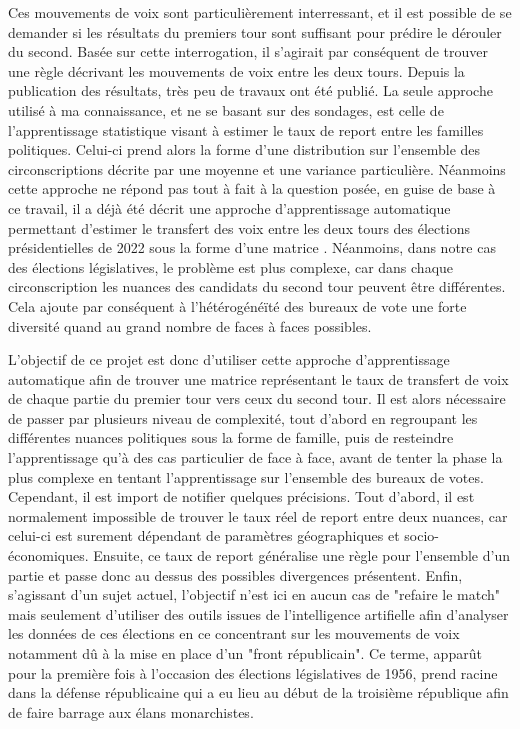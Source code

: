 \documentclass[11pt]{article}
\begin{document}
    Ces mouvements de voix sont particulièrement interressant, et il est possible de se demander si les résultats du premiers tour sont suffisant pour prédire le dérouler du second. Basée sur cette interrogation, il s'agirait par conséquent de trouver une règle décrivant les mouvements de voix entre les deux tours. Depuis la publication des résultats, très peu de travaux ont été publié. La seule approche utilisé à ma connaissance, et ne se basant sur des sondages, est celle de l'apprentissage statistique \cite{Amblard_2024} visant à estimer le taux de report entre les familles politiques. Celui-ci prend alors la forme d'une distribution sur l'ensemble des circonscriptions décrite par une moyenne et une variance particulière. Néanmoins cette approche ne répond pas tout à fait à la question posée, en guise de base à ce travail, il a déjà été décrit une approche d'apprentissage automatique permettant d'estimer le transfert des voix entre les deux tours des élections présidentielles de 2022 sous la forme d'une matrice \cite{Perrinet_2022}. Néanmoins, dans notre cas des élections législatives, le problème est plus complexe, car dans chaque circonscription les nuances des candidats du second tour peuvent être différentes. Cela ajoute par conséquent à l'hétérogénéïté des bureaux de vote une forte diversité quand au grand nombre de faces à faces possibles. 

    L'objectif de ce projet est donc d'utiliser cette approche d'apprentissage automatique afin de trouver une matrice représentant le taux de transfert de voix de chaque partie du premier tour vers ceux du second tour. Il est alors nécessaire de passer par plusieurs niveau de complexité, tout d'abord en regroupant les différentes nuances politiques sous la forme de famille, puis de resteindre l'apprentissage qu'à des cas particulier de face à face, avant de tenter la phase la plus complexe en tentant l'apprentissage sur l'ensemble des bureaux de votes. Cependant, il est import de notifier quelques précisions. Tout d'abord, il est normalement impossible de trouver le taux réel de report entre deux nuances, car celui-ci est surement dépendant de paramètres géographiques et socio-économiques. Ensuite, ce taux de report généralise une règle pour l'ensemble d'un partie et passe donc au dessus des possibles divergences présentent. Enfin, s'agissant d'un sujet actuel, l'objectif n'est ici en aucun cas de "refaire le match" mais seulement d'utiliser des outils issues de l'intelligence artifielle afin d'analyser les données de ces élections en ce concentrant sur les mouvements de voix notamment dû à la mise en place d'un "front républicain". Ce terme, apparût pour la première fois à l'occasion des élections législatives de 1956, prend racine dans la défense républicaine qui a eu lieu au début de la troisième république afin de faire barrage aux élans monarchistes.
    
\end{document}
